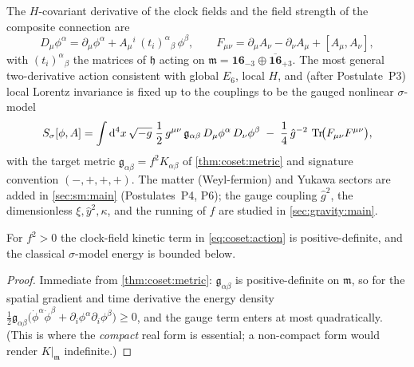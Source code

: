 The $H$-covariant derivative of the clock fields and the field strength of the
composite connection are
\begin{equation}\label{eq:coset:covD}
  D_{\mu}\phi^{\alpha}
    = \partial_{\mu}\phi^{\alpha}
      + A_{\mu}{}^{i}\,(t_{i})^{\alpha}{}_{\beta}\,\phi^{\beta},
  \qquad
  F_{\mu\nu}
    = \partial_{\mu}A_{\nu} - \partial_{\nu}A_{\mu} + [A_{\mu},A_{\nu}],
\end{equation}
with $(t_{i})^{\alpha}{}_{\beta}$ the matrices of $\mathfrak h$ acting on
$\mathfrak m = \mathbf{16}_{-3}\oplus\overline{\mathbf{16}}_{+3}$. The most
general two-derivative action consistent with global $E_{6}$, local $H$, and
(after Postulate~P3) local Lorentz invariance is fixed up to the couplings to be
the gauged nonlinear $\sigma$-model
\begin{equation}\label{eq:coset:action}
  S_{\sigma}[\phi,A]
   = \int \mathrm{d}^{4}x\,\sqrt{-g}\;
     \frac12\, g^{\mu\nu}\,\mathfrak g_{\alpha\beta}\,
       D_{\mu}\phi^{\alpha}\,D_{\nu}\phi^{\beta}
     \;-\;\frac14\,\hat g^{-2}\,\operatorname{Tr}\!\bigl(F_{\mu\nu}F^{\mu\nu}\bigr),
\end{equation}
with the target metric $\mathfrak g_{\alpha\beta} = f^{2}K_{\alpha\beta}$ of
\autoref{thm:coset:metric} and signature convention $(-,+,+,+)$. The matter
(Weyl-fermion) and Yukawa sectors are added in
\autoref{sec:sm:main} (Postulates~P4, P6); the gauge coupling $\hat g^{2}$,
the dimensionless $\xi,\hat y^{2},\kappa$, and the running of $f$ are studied in
\autoref{sec:gravity:main}.

\begin{lemma}\label{lem:coset:positivity}
For $f^{2}>0$ the clock-field kinetic term in \eqref{eq:coset:action} is
positive-definite, and the classical $\sigma$-model energy is bounded below.
\end{lemma}

\begin{proof}
Immediate from \autoref{thm:coset:metric}: $\mathfrak g_{\alpha\beta}$ is
positive-definite on $\mathfrak m$, so for the spatial gradient and time
derivative the energy density
$\tfrac12\mathfrak g_{\alpha\beta}\bigl(\dot\phi^{\alpha}\dot\phi^{\beta}
+\partial_{i}\phi^{\alpha}\partial_{i}\phi^{\beta}\bigr)\ge 0$, and the gauge
term enters at most quadratically. (This is where the \emph{compact} real form
is essential; a non-compact form would render $K|_{\mathfrak m}$ indefinite.)
\end{proof}

